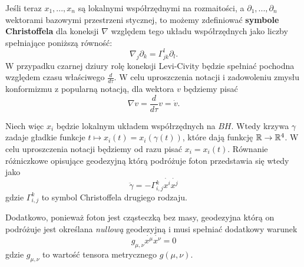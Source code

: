 
%

Jeśli teraz $x_1,..., x_n$ są lokalnymi współrzędnymi na rozmaitości, a $\partial_1,...,\partial_n$ wektorami bazowymi przestrzeni stycznej, to możemy zdefiniować \textbf{symbole Christoffela} dla koneksji $\nabla$ względem tego układu współrzędnych jako liczby spełniające poniższą równość:
$$ \nabla_j \partial_k=\Gamma_{j k}^l \partial_l. $$
W przypadku czarnej dziury rolę koneksji Levi-Civity będzie spełniać pochodna względem czasu właściwego $\frac{d}{d\tau}$. W celu uproszczenia notacji i zadowoleniu zmysłu konformizmu z popularną notacją, dla wektora $v$ będziemy pisać 
$$ \nabla v = \frac{d}{d\tau} v = \dot{v}. $$

Niech więc $x_i$ będzie lokalnym układem współrzędnych na $BH$. Wtedy krzywa $\gamma$ zadaje gładkie funkcje $t \mapsto x_i (t)=x_i (\gamma(t))$, które dają funkcję $\mathbb{R} \to \mathbb{R}^4$. W celu uproszczenia notacji będziemy 
od razu pisać $x_i=x_i(t)$. Równanie różniczkowe opisujące geodezyjną którą podróżuje foton przedstawia się wtedy jako
$$ \ddot{\gamma} = - \Gamma_{i,j}^k \dot{x^i} \dot{x^j} $$
gdzie $\Gamma_{i,j}^k$ to symbol Christoffela drugiego rodzaju.%

Dodatkowo, ponieważ foton jest cząsteczką bez masy, geodezyjna którą on podróżuje jest określana \emph{nullową} geodezyjną i musi spełniać dodatkowy warunek
$$ g_{\mu,\nu} \dot{x^\mu} \dot{x^\nu} = 0 $$
gdzie $g_{\mu,\nu}$ to wartość tensora metrycznego $g(\mu, \nu)$.








